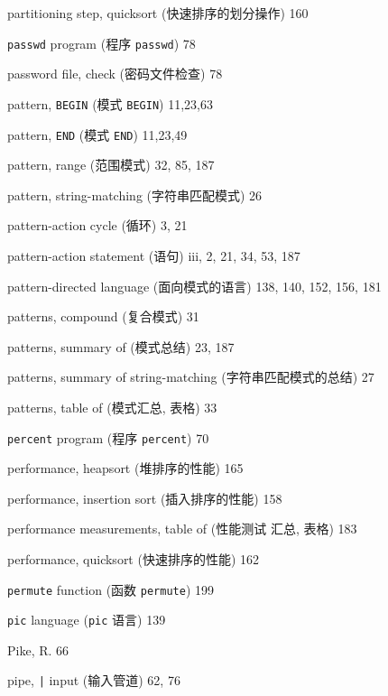 \begin{multicols}{2}
\hangindent=2pc  partitioning step, quicksort
(快速排序的划分操作) 160

\hangindent=2pc  \verb'passwd' program (程序 \verb'passwd') 78

\hangindent=2pc  password file, check (密码文件检查) 78

\hangindent=2pc  pattern, \verb'BEGIN' (模式 \verb'BEGIN') 11,23,63

\hangindent=2pc  pattern, \verb'END' (模式 \verb'END') 11,23,49

\hangindent=2pc  pattern, range (范围模式) 32, 85, 187

\hangindent=2pc  pattern, string-matching (字符串匹配模式) 26

\hangindent=2pc  pattern-action cycle (\patact 循环) 3, 21

\hangindent=2pc  pattern-action statement (\patact 语句)
iii, 2, 21, 34, 53, 187

\hangindent=2pc  pattern-directed language (面向模式的语言)
138,  140, 152, 156, 181

\hangindent=2pc  patterns, compound (复合模式) 31

\hangindent=2pc  patterns, summary of (模式总结) 23, 187

\hangindent=2pc  patterns, summary of string-matching
(字符串匹配模式的总结) 27

\hangindent=2pc  patterns, table of (模式汇总, 表格) 33

\hangindent=2pc  \verb'percent' program (程序 \verb'percent') 70

\hangindent=2pc  performance, heapsort (堆排序的性能) 165

\hangindent=2pc  performance, insertion sort (插入排序的性能) 158

\hangindent=2pc  performance measurements, table of (性能测试
汇总, 表格) 183

\hangindent=2pc  performance, quicksort (快速排序的性能) 162

\hangindent=2pc  \verb'permute' function (函数 \verb'permute') 199

\hangindent=2pc  \verb'pic' language (\verb'pic' 语言) 139

\hangindent=2pc  Pike, R. 66

\hangindent=2pc  pipe, \verb'|' input (输入管道) 62, 76


\end{multicols}
